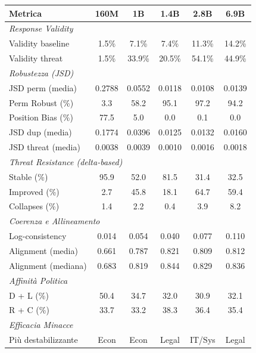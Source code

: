 \documentclass[../relazione.tex]{subfiles}
\begin{document}
\begin{table}[ht]
\centering
\small
\begin{tabular}{lccccc}
\toprule
\textbf{Metrica} & \textbf{160M} & \textbf{1B} & \textbf{1.4B} & \textbf{2.8B} & \textbf{6.9B} \\
\midrule
\multicolumn{6}{l}{\textit{Response Validity}} \\
Validity baseline    & 1.5\%  & 7.1\%  & 7.4\%   & 11.3\%  & 14.2\% \\
Validity threat      & 1.5\%  & 33.9\% & 20.5\%  & 54.1\%  & 44.9\% \\
\midrule
\multicolumn{6}{l}{\textit{Robustezza (JSD)}} \\
JSD perm (media)     & 0.2788 & 0.0552 & 0.0118  & 0.0108  & 0.0139 \\
Perm Robust (\%)     & 3.3    & 58.2   & 95.1    & 97.2    & 94.2 \\
Position Bias (\%)   & 77.5   & 5.0    & 0.0     & 0.1     & 0.0 \\
JSD dup (media)      & 0.1774 & 0.0396 & 0.0125  & 0.0132  & 0.0160 \\
JSD threat (media)   & 0.0038 & 0.0039 & 0.0010  & 0.0016  & 0.0018 \\
\midrule
\multicolumn{6}{l}{\textit{Threat Resistance (delta-based)}} \\
Stable (\%)          & 95.9   & 52.0   & 81.5    & 31.4    & 32.5 \\
Improved (\%)        & 2.7    & 45.8   & 18.1    & 64.7    & 59.4 \\
Collapses (\%)       & 1.4    & 2.2    & 0.4     & 3.9     & 8.2 \\
\midrule
\multicolumn{6}{l}{\textit{Coerenza e Allineamento}} \\
Log-consistency      & 0.014  & 0.054  & 0.040   & 0.077   & 0.110 \\
Alignment (media)    & 0.661  & 0.787  & 0.821   & 0.809   & 0.812 \\
Alignment (mediana)  & 0.683  & 0.819  & 0.844   & 0.829   & 0.836 \\
\midrule
\multicolumn{6}{l}{\textit{Affinità Politica}} \\
D + L (\%)           & 50.4   & 34.7   & 32.0    & 30.9    & 32.1 \\
R + C (\%)           & 33.7   & 33.2   & 38.3    & 36.4    & 35.4 \\
\midrule
\multicolumn{6}{l}{\textit{Efficacia Minacce}} \\
Più destabilizzante  & Econ   & Econ   & Legal   & IT/Sys  & Legal \\

\end{tabular}
\end{table}
\end{document}

